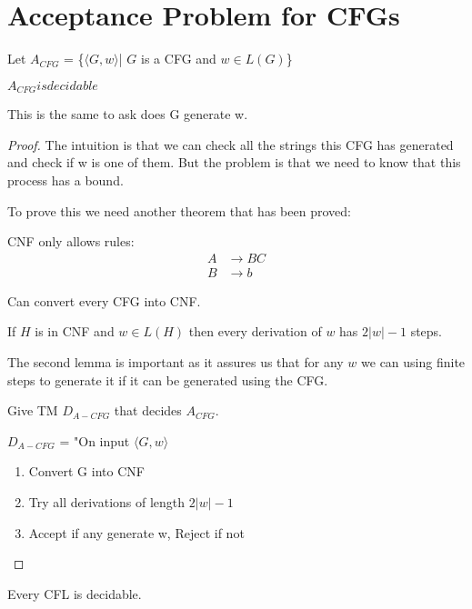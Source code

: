 \section{Acceptance Problem for CFGs}
\begin{theorem}
    Let \(A_{CFG}\) = \{\(\langle G, w \rangle \)| \(G\) is a CFG and \(w \in L(G)\)\} 

    \(A_{CFG} is decidable \) 
\end{theorem}
This is the same to ask does G generate w.
\begin{proof}
    The intuition is that we can check all the strings this CFG has generated and check if w is one of them. But the problem is that we need to know that this process has a bound.   

    To prove this we need another theorem that has been proved:
    \begin{theorem} \label{theorem: Chomsky}
        CNF only allows rules:
        \begin{align*}
            A &\rightarrow BC\\
            B &\rightarrow b
        \end{align*}
    \end{theorem}
    \begin{lemma}
        Can convert every CFG into CNF.
    \end{lemma}
    \begin{lemma}
        If \(H\) is in CNF and \(w \in L(H)\) then every derivation of \(w\) has \(2 |w| - 1\) steps.  
    \end{lemma}

    The second lemma is important as it assures us that for any \(w\) we can using finite steps to generate it if it can be generated using the CFG.

   Give TM \(D_{A-CFG}\) that decides \(A_{CFG}\).  

   \(D_{A-CFG}\) = "On input \(\langle G, w \rangle\) 
   \begin{enumerate}
    \item Convert G into CNF
    \item Try all derivations of length \(2|w| - 1\) 
    \item Accept if any generate w, Reject if not
   \end{enumerate}
\end{proof}

\begin{corollary}
    Every CFL is decidable.
\end{corollary}

